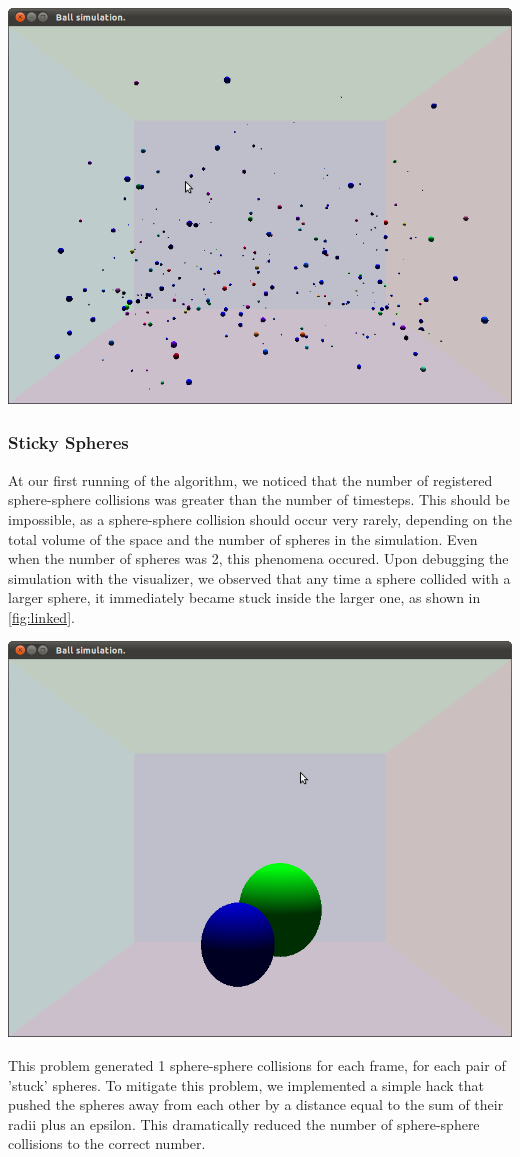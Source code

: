 \documentclass[conference]{IEEEtran}
\begin{document}
\begin{center}
	\includegraphics[width=.45\textwidth]{lots.png}
	\label{fig:lots}
\end{center}

\subsubsection{Sticky Spheres}
At our first running of the algorithm, we noticed that the number of registered sphere-sphere collisions was greater than the number of timesteps.  This should be impossible, as a sphere-sphere collision should
occur very rarely, depending on the total volume of the space and the number of spheres in the simulation.  Even when the number of spheres was 2, this phenomena occured.  Upon debugging the simulation with the visualizer,
we observed that any time a sphere collided with a larger sphere, it immediately became stuck inside the larger one, as shown in \ref{fig:linked}.  

\begin{center}
	\includegraphics[width=.45\textwidth]{linked.png}
	\label{fig:linked}
\end{center}

This problem generated 1 sphere-sphere collisions for each frame, for each pair of 'stuck' spheres.  To mitigate this problem, we implemented a simple hack that pushed the spheres away from each other by a distance equal to the sum of their radii plus an epsilon.
This dramatically reduced the number of sphere-sphere collisions to the correct number.
\end{document}
